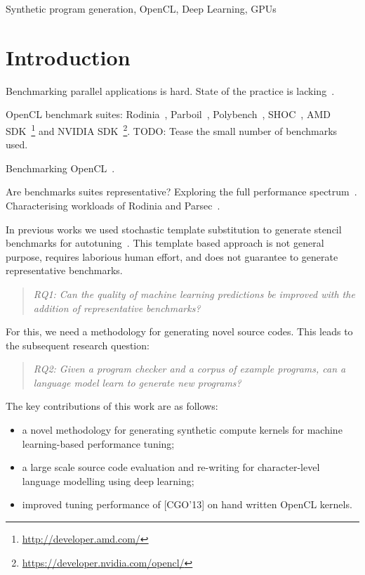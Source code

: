 \documentclass[preprint,nonatbib,10pt,nocopyrightspace]{sigplanconf}
\begin{document}


\keywords
Synthetic program generation, %
OpenCL, %
Deep Learning, %
GPUs

\section{Introduction}\label{sec:introduction}

Benchmarking parallel applications is hard. State of the practice is
lacking~\cite{Belli2015}.

OpenCL benchmark suites:
Rodinia~\cite{Che2009}, %
Parboil~\cite{Stratton2012}, %
Polybench~\cite{Grauer-Gray2012}, %
SHOC~\cite{Danalis2010}, %
AMD SDK~\footnote{\url{http://developer.amd.com/}} %
and NVIDIA
SDK~\footnote{\url{https://developer.nvidia.com/opencl/}}. %
TODO: Tease the small number of benchmarks used.

Benchmarking OpenCL~\cite{Tobergte2013a}.

Are benchmarks suites representative? Exploring the full performance
spectrum~\cite{Ryoo2015}. Characterising workloads of Rodinia and
Parsec~\cite{Che2010}.

In previous works we used stochastic template substitution to generate
stencil benchmarks for
autotuning~\cite{Cummins2015a,Cummins2016}. This template based
approach is not general purpose, requires laborious human effort, and
does not guarantee to generate representative benchmarks.

\begin{quote}
  \emph{RQ1: Can the quality of machine learning predictions be
    improved with the addition of representative benchmarks?}
\end{quote}

For this, we need a methodology for generating novel source
codes. This leads to the subsequent research question:

\begin{quote}
  \emph{RQ2: Given a program checker and a corpus of example programs,
    can a language model learn to generate new programs?}
\end{quote}

\noindent
The key contributions of this work are as follows:%
\begin{itemize}
\item a novel methodology for generating synthetic compute kernels for
  machine learning-based performance tuning;
\item a large scale source code evaluation and re-writing for
  character-level language modelling using deep learning;
\item improved tuning performance of [CGO'13] on hand written OpenCL
  kernels.
\end{itemize}
\end{document}
